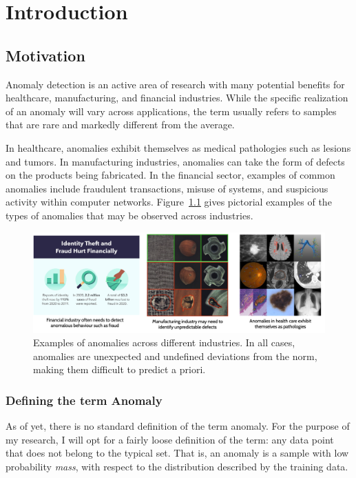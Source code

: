 \chapter{Introduction}

\section{Motivation}

Anomaly detection is an active area of research with many potential benefits for healthcare, manufacturing, and financial industries. While the specific realization of an anomaly will vary across applications, the term usually refers to samples that are rare and markedly different from the average.

In healthcare, anomalies exhibit themselves as medical pathologies such as lesions and tumors. In  manufacturing industries, anomalies can take the form of defects on the products being fabricated. In the financial sector, examples of common anomalies include fraudulent transactions, misuse of systems, and suspicious activity within computer networks. Figure~\ref{fig:anoex} gives pictorial examples of the types of anomalies that may be observed across industries.

\begin{figure}[bhp]
\centering
    \centering
    \includegraphics[width=\textwidth]{figures/anomaly_examples.png}
    \caption{Examples of anomalies across different industries. In all cases, anomalies are unexpected and undefined deviations from the norm, making them difficult to predict a priori.}
    \label{fig:anoex}

\end{figure}%

\subsection*{Defining the term Anomaly}

As of yet, there is no standard definition of the term anomaly. 
For the purpose of my research, I will opt for a fairly loose definition of the term: any data point that does not belong to the typical set. That is, an anomaly is a sample with low probability \textit{mass}, with respect to the distribution described by the training data. 

